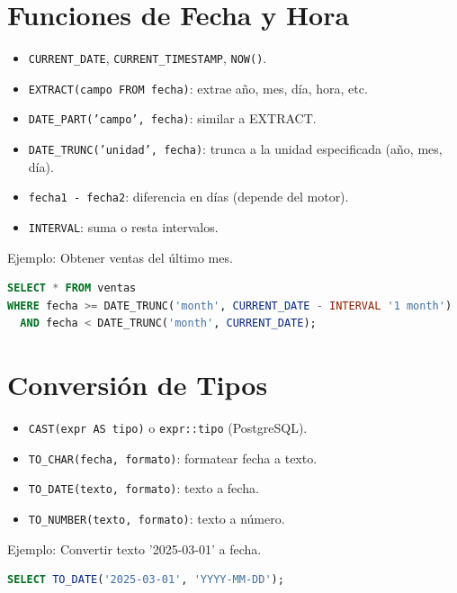 \documentclass[12pt,a4paper,openany,oneside]{book}
\begin{document}
\section{Funciones de Fecha y Hora}
\begin{itemize}
    \item \texttt{CURRENT\_DATE}, \texttt{CURRENT\_TIMESTAMP}, \texttt{NOW()}.
    \item \texttt{EXTRACT(campo FROM fecha)}: extrae año, mes, día, hora, etc.
    \item \texttt{DATE\_PART('campo', fecha)}: similar a EXTRACT.
    \item \texttt{DATE\_TRUNC('unidad', fecha)}: trunca a la unidad especificada (año, mes, día).
    \item \texttt{fecha1 - fecha2}: diferencia en días (depende del motor).
    \item \texttt{INTERVAL}: suma o resta intervalos.
\end{itemize}
Ejemplo: Obtener ventas del último mes.
\begin{lstlisting}[language=SQL]
SELECT * FROM ventas
WHERE fecha >= DATE_TRUNC('month', CURRENT_DATE - INTERVAL '1 month')
  AND fecha < DATE_TRUNC('month', CURRENT_DATE);
\end{lstlisting}

\section{Conversión de Tipos}
\begin{itemize}
    \item \texttt{CAST(expr AS tipo)} o \texttt{expr::tipo} (PostgreSQL).
    \item \texttt{TO\_CHAR(fecha, formato)}: formatear fecha a texto.
    \item \texttt{TO\_DATE(texto, formato)}: texto a fecha.
    \item \texttt{TO\_NUMBER(texto, formato)}: texto a número.
\end{itemize}
Ejemplo: Convertir texto '2025-03-01' a fecha.
\begin{lstlisting}[language=SQL]
SELECT TO_DATE('2025-03-01', 'YYYY-MM-DD');
\end{lstlisting}
\end{document}
